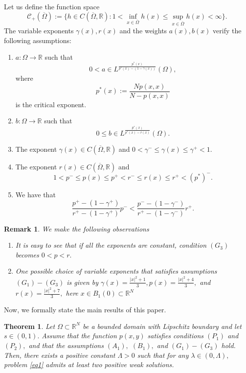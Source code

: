 \documentclass[11pt]{article}
\newtheorem{theorem}{Theorem}[section] %
\newtheorem{remark}{Remark}[section]
\newcommand{\R}{\mathbb{R}}
\newcommand{\ga} {\gamma}
\newcommand{\om} {\Omega}
\newcommand{\oline} {\overline}
\newcommand{\ra} {\rightarrow}
\newcommand{\real}{\mathbb{R}}
\newcommand{\rnn}{\mathbb{R}^{N}}
\begin{document}
Let us define the function space
$$
\mathcal{C}_+(\oline\om):=
\Big \{h\in C(\oline\om,\R):1<
\inf_{x\in\oline\om}h(x)\le
\sup_{x\in \oline\om}h(x)<\infty
\Big \}.
$$
The variable exponents
$\ga(x),r(x)$
and the weights
$a(x),b(x)$
verify the following assumptions:
\begin{enumerate}

\item[$(A_1)$]
$a:\om \ra \real$
such that
$$
0<a\in L^{
\frac{p^*(x)}{p^*(x)-(1-\ga(x))}}(\om),
$$
where
$$
p^*(x):=
\frac{Np(x,x)}{N-p(x,x)}
$$
is the critical exponent.

\item[$(B_1)$]
$b:\om \ra \real$
such that
$$
0\le b\in L^{
\frac{p^*(x)}{p^*(x)-r(x)}}(\om) .
$$

    
\item[$(G_1)$] The exponent
$\ga(x)\in C(\oline\om,\real)$
and
$0<\ga^-\le \ga(x)\le \ga^+<1$.
    
\item[$(G_2)$] The exponent
$r(x)\in C(\oline\om,\real)$
and
$$
1<p^-\le p(x)\le p^+<r^-\le r(x)\le r^+<(p^*)^- .
$$
    
\item[$(G_3)$] We have that
    \begin{equation}\label{eq5}
\frac{p^+-(1-\ga^+)}{r^+-(1-\ga^+)}p^-<
\frac{p^--(1-\ga^-)}{r^+-(1-\ga^-)}r^+.
    \end{equation}
\end{enumerate}

\begin{remark}\rm
 We make the following observations
\begin{enumerate}
    
\item It is easy to see that if all the 
    exponents are constant, condition
$(G_3)$
becomes
$0<p<r.$
    
\item  One possible choice of variable 
    exponents that satisfies assumptions
$(G_1)-(G_3)$
is given by
$\gamma(x) = 
\frac{|x|^2+1}{3}, p(x) = 
\frac{|x|^2+4}{3},$
and
$r(x) = 
\frac{|x|^2+7}{3},$
here
$x\in B_1(0)\subset\rnn$
\end{enumerate}    
\end{remark}

Now, we formally state the main results of this paper.


\begin{theorem}\label{main_theorem}
    Let
$\Omega \subset \mathbb{R}^N$
be a bounded domain with Lipschitz boundary and let
$s \in (0,1).$
Assume that the function
$p(x, y)$
satisfies conditions
$(P_1)$
and
$(P_2),$
and that the assumptions
$(A_1),$
$(B_1),$
and
$(G_1)-(G_3)$
hold.
Then, there exists a positive constant
$\Lambda > 0$
such that for any
$\lambda \in (0, \Lambda),$
problem \eqref{eq1} admits at least two positive 
weak solutions.
\end{theorem}
\end{document}
